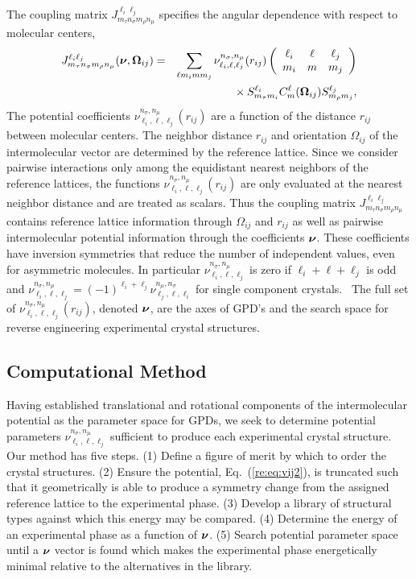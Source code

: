\documentclass[preprint]{revtex4}
\newcommand{\mb}[1]{\ensuremath{\mbox{\boldmath $ #1 $}}}
\begin{document}
The coupling matrix $J_{m_\tau n_\sigma m_\rho n_\mu}^{\ell_i
\ell_j}$ specifies the angular dependence with respect to molecular
centers,
\begin{eqnarray}
\label{coupling} J_{m_\tau n_\sigma m_\rho n_\mu}^{\ell_i
\ell_j}(\mb{\nu},\mb{\Omega}_{ij})&=&\sum_{\ell m_i m m_j}
\nu_{\ell_i,\ell,\ell_j}^{n_\sigma,n_\mu}(r_{ij})\left(\begin{array}{ccc}
 \ell_i & \ell & \ell_j \\ m_i & m & m_j
\end{array}\right)\nonumber\\
&&{}\times S^{\ell_i}_{m_\tau m_i}C_{m}^{\ell}(\mb{\Omega}_{ij})
S^{\ell_j}_{m_\rho m_j},
\end{eqnarray}
The potential coefficients
$\nu_{\ell_i,\ell,\ell_j}^{n_\sigma,n_\mu}(r_{ij})$ are a function
of the distance $r_{ij}$ between molecular centers. The neighbor
distance $r_{ij}$ and orientation $\Omega_{ij}$ of the
intermolecular vector are determined by the reference lattice. Since
we consider pairwise interactions only among the equidistant nearest
neighbors of the reference lattices, the functions
$\nu_{\ell_i,\ell,\ell_j}^{n_\sigma,n_\mu}(r_{ij})$ are only
evaluated at the nearest neighbor distance and are treated as
scalars. Thus the coupling matrix $J_{m_\tau n_\sigma m_\rho
n_\mu}^{\ell_i \ell_j}$ contains reference lattice information
through $\Omega_{ij}$ and $r_{ij}$ as well as pairwise
intermolecular potential information through the coefficients
$\mb{\nu}$. These coefficients have inversion symmetries that reduce
the number of independent values, even for asymmetric molecules.  In
particular $\nu_{\ell_i,\ell,\ell_j}^{n_\sigma,n_\mu}$ is zero if
$\ell_i+\ell+\ell_j$ is odd and
$\nu_{\ell_i,\ell,\ell_j}^{n_\sigma,n_\mu}=
(-1)^{\ell_i+\ell_j}\nu_{\ell_j,\ell,\ell_i}^{n_\mu,n_\sigma}$ for
single component crystals.~\cite{Avoird80} The full set of
$\nu_{\ell_i,\ell,\ell_j}^{n_\sigma,n_\mu}(r_{ij})$, denoted
$\mb{\nu}$, are the axes of GPD's and the search space for reverse
engineering experimental crystal structures.

\subsection{Computational Method}
\label{Computational_Strategy}

Having established translational and rotational components of the
intermolecular potential as the parameter space for GPDs, we seek to
determine potential parameters
$\nu_{\ell_i,\ell,\ell_j}^{n_\sigma,n_\mu}$ sufficient to produce
each experimental crystal structure. Our method has five steps. (1)
Define a figure of merit by which to order the crystal structures. (2)
Ensure the potential, Eq.~(\ref{re:eq:vij2}), is truncated such that
it geometrically is able to produce a symmetry change from the
assigned reference lattice to the experimental phase. (3) Develop a
library of structural types against which this energy may be
compared. (4) Determine the energy of an experimental phase as a
function of $\mb{\nu}$. (5) Search potential parameter space until a
$\mb{\nu}$ vector is found which makes the experimental phase
energetically minimal relative to the alternatives in the library.
\end{document}
